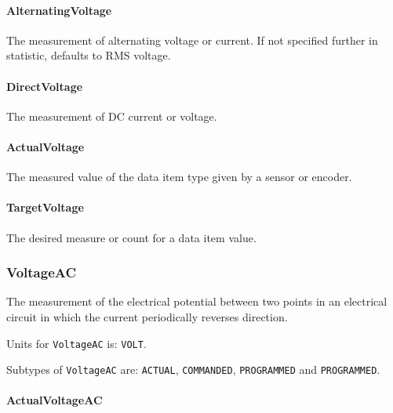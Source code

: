 \paragraph{AlternatingVoltage}\mbox{}
\label{sec:AlternatingVoltage}



The measurement of alternating voltage or current.   If not specified further in statistic, defaults to RMS voltage. 


\paragraph{DirectVoltage}\mbox{}
\label{sec:DirectVoltage}



The measurement of DC current or voltage.


\paragraph{ActualVoltage}\mbox{}
\label{sec:ActualVoltage}



The measured value of the data item type given by a sensor or encoder.


\paragraph{TargetVoltage}\mbox{}
\label{sec:TargetVoltage}



The desired measure or count for a data item value.


\subsubsection{VoltageAC}
\label{sec:VoltageAC}



The measurement of the electrical potential between two points in an electrical circuit in which the current periodically reverses direction.


Units for \texttt{VoltageAC} is: \texttt{VOLT}.


Subtypes of \texttt{VoltageAC} are: \texttt{ACTUAL}, \texttt{COMMANDED}, \texttt{PROGRAMMED} and \texttt{PROGRAMMED}. 
\FloatBarrier

\paragraph{ActualVoltageAC}\mbox{}
\label{sec:ActualVoltageAC}



